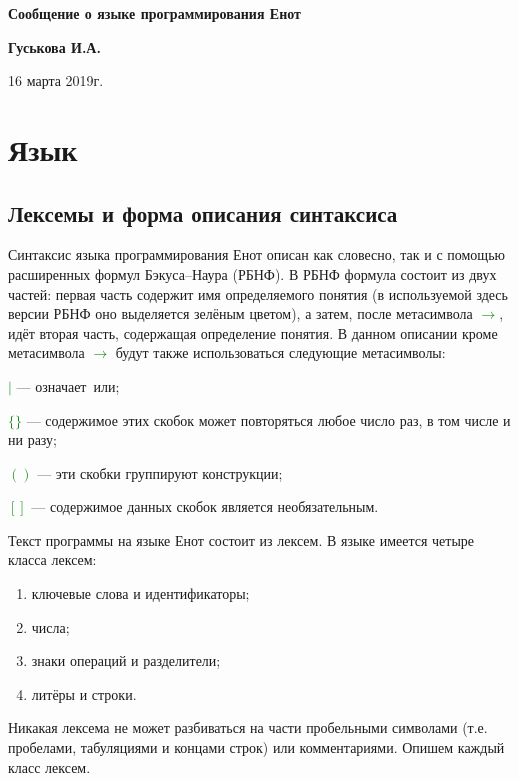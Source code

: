 \documentclass[10pt]{report}
\begin{document}
\begin{titlepage}
\begin{center}
\vspace*{8cm}

{\bf\Huge
Сообщение о языке программирования Енот

} \vspace{2.5cm}


\LARGE
\textbf{Гуськова И.А.}

 \vspace{2.5cm}

{16 марта 2019г.}

\end{center}
\end{titlepage}
\tableofcontents

\newpage

\chapter{Язык}
    \section{Лексемы и форма описания синтаксиса}

Синтаксис языка программирования Енот описан как словесно, так и с помощью расширенных формул Бэкуса--Наура (РБНФ). В РБНФ формула состоит из двух частей: первая часть содержит имя определяемого понятия (в используемой здесь версии РБНФ оно выделяется зелёным цветом), а затем, после метасимвола \textcolor{Green}{$\to$}, идёт вторая часть, содержащая определение понятия. В данном описании кроме метасимвола \textcolor{Green}{$\to$} будут также использоваться следующие метасимволы:

\textcolor{Green}{$|$} --- означает\ \glqq или\grqq;

\textcolor{Green}{$\{\}$} --- содержимое этих скобок может повторяться любое число раз, в том числе и ни разу;

\textcolor{Green}{$( )$} --- эти скобки группируют конструкции;

\textcolor{Green}{$[ ]$} --- содержимое данных скобок является необязательным.

Текст программы на языке Енот состоит из лексем. В языке имеется четыре класса лексем:
\begin{enumerate}
    \item ключевые слова и идентификаторы;
    \item числа;
    \item знаки операций и разделители;
    \item литёры и строки.
\end{enumerate}
Никакая лексема не может разбиваться на части пробельными символами (т.е. пробелами, табуляциями и концами строк) или комментариями. Опишем каждый класс лексем.
\end{document}
